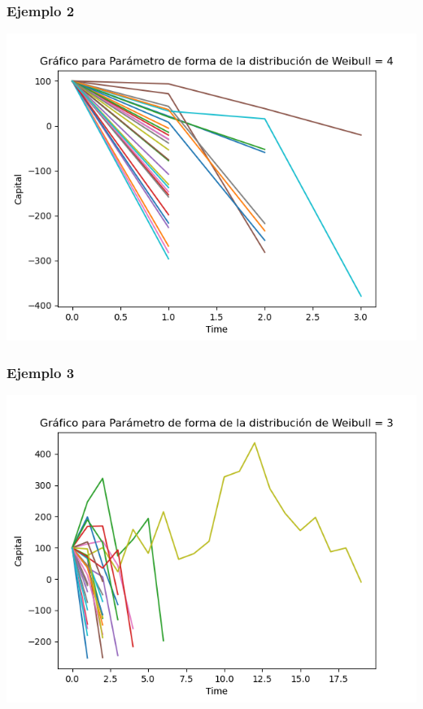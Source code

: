 \documentclass{article}
\begin{document}
\subsubsection{Ejemplo 2}
\includegraphics[scale = 0.8]{weib2.png}

\subsubsection{Ejemplo 3}
\includegraphics[scale = 0.8]{weib3.png}
\end{document}
